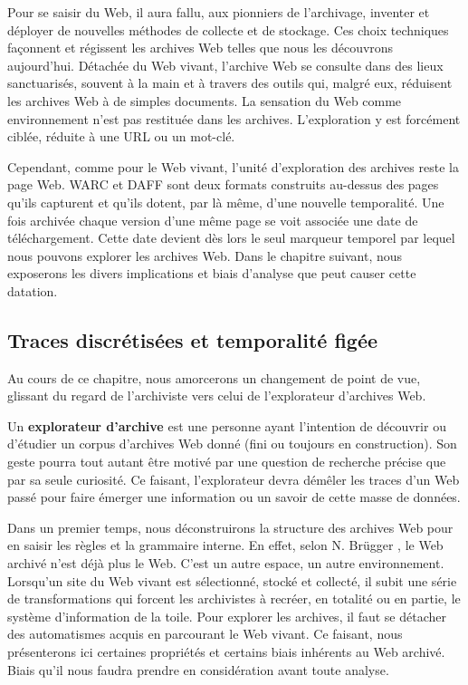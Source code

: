 \documentclass[symmetric,justified,marginals=raggedouter]{tufte-book}
\begin{document}
Pour se saisir du Web, il aura fallu, aux pionniers de l'archivage, inventer et déployer de nouvelles méthodes de collecte et de stockage. Ces choix techniques façonnent et régissent les archives Web telles que nous les découvrons aujourd'hui. Détachée du Web vivant, l'archive Web se consulte dans des lieux sanctuarisés, souvent à la main et à travers des outils qui, malgré eux, réduisent les archives Web à de simples documents. La sensation du Web comme environnement n'est pas restituée dans les archives. L'exploration y est forcément ciblée, réduite à une URL ou un mot-clé. 

Cependant, comme pour le Web vivant, l'unité d'exploration des archives reste la page Web. WARC et DAFF sont deux formats construits au-dessus des pages qu'ils capturent et qu'ils dotent, par là même, d'une nouvelle temporalité. Une fois archivée chaque version d'une même page se voit associée une date de téléchargement. Cette date devient dès lors le seul marqueur temporel par lequel nous pouvons explorer les archives Web. Dans le chapitre suivant, nous exposerons les divers implications et biais d'analyse que peut causer cette datation.


\cleardoublepage
\begin{minipage}[t,leftmargin=5em]{1.5\linewidth}%
\begin{adjustwidth}{-0.5cm}{}
\chapter{Traces discrétisées et temporalité figée} 
\label{chap:4}
\end{adjustwidth}
\end{minipage}
\hfill

\noindent Au cours de ce chapitre, nous amorcerons un changement de point de vue, glissant du regard de l'archiviste vers celui de l'explorateur d'archives Web. 

Un \textbf{explorateur d'archive} est une personne ayant l'intention de découvrir ou d'étudier un corpus d'archives Web donné (fini ou toujours en construction). Son geste pourra tout autant être motivé par une question de recherche précise que par sa seule curiosité. Ce faisant, l'explorateur devra démêler les traces d'un Web passé pour faire émer\-ger une information ou un savoir de cette masse de données. 

Dans un premier temps, nous déconstruirons la structure des ar\-chives Web pour en saisir les règles et la grammaire interne. En effet, selon N. Brügger \citep{brugger_website_2009}, le Web archivé n'est déjà plus le Web. C'est un autre espace, un autre environnement. Lorsqu'un site du Web vivant est sélectionné, stocké et collecté, il subit une série de transformations qui forcent les archivistes à recréer, en totalité ou en partie, le système d'information de la toile. Pour explorer les archives, il faut se détacher des automatismes acquis en parcourant le Web vivant. Ce faisant, nous présenterons ici certaines propriétés et certains biais inhérents au Web archivé. Biais qu'il nous faudra prendre en considération avant toute analyse. 
\end{document}
